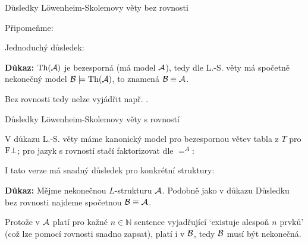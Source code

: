 \documentclass{beamer}
\begin{document}
\begin{frame}{Důsledky Löwenheim-Skolemovy věty bez rovnosti}

    Připomeňme:

    \smallskip


    \medskip

    Jednoduchý důsledek:

    \smallskip


    \textbf{Důkaz:} $\operatorname{Th}(\mathcal{A})$ je bezesporná (má model $\mathcal{A}$), tedy dle L.-S. věty má spočetně nekonečný model $\mathcal{B}\models\operatorname{Th}(\mathcal{A})$, to znamená $\mathcal{B}\equiv\mathcal{A}$.\hfill\qedsymbol

    \medskip

    Bez rovnosti tedy nelze vyjádřit např. .

\end{frame}


\begin{frame}{Důsledky Löwenheim-Skolemovy věty s rovností}

    V důkazu L.-S. věty máme kanonický model pro bezespornou větev tabla z $T$ pro $\mathrm{F}\bot$; pro jazyk s rovností stačí faktorizovat dle $=^A$:

    \smallskip


    \medskip

    I tato verze má snadný důsledek pro konkrétní struktury:

    \smallskip


    \smallskip

    \textbf{Důkaz:}
    Mějme nekonečnou $L$-strukturu $\mathcal{A}$. Podobně jako v důkazu Důsledku bez rovnosti najdeme \alert{spočetnou} $\mathcal{B}\equiv\mathcal{A}$. 
    
    Protože v $\mathcal{A}$ platí pro kažné $n\in\mathbb N$ sentence vyjadřující `existuje alespoň $n$ prvků' (což lze pomocí rovnosti snadno zapsat), platí i v $\mathcal{B}$, tedy $\mathcal{B}$ musí být nekonečná.\hfill\qedsymbol

\end{frame}
\end{document}
